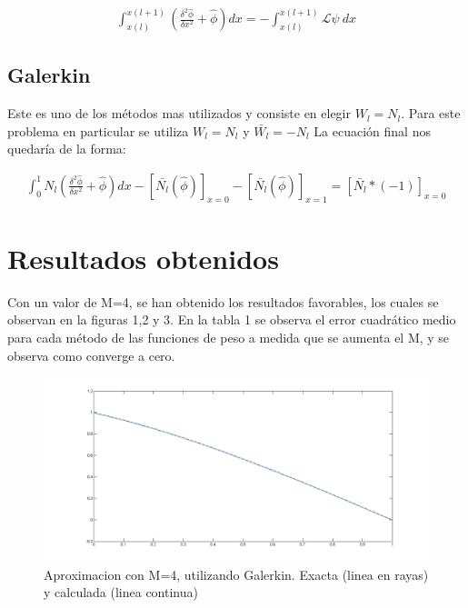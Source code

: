 \documentclass[11pt]{article}
\begin{document}
\begin{equation}
\begin{split}
\int_{x(l)}^{x(l+1)} (\frac{\delta^2\hat{\phi}}{\delta x^2} + \hat{\phi}) dx = - \int_{x(l)}^{x(l+1)} \mathcal{L} \psi \ dx
\end{split}
\end{equation}

\bigskip 
\subsection{Galerkin}

Este es uno de los m\'etodos mas utilizados y consiste en elegir $W_l = N_l$. Para este problema en particular se utiliza $W_l = N_l$ y $\bar{W_l} = -N_l$ La ecuaci\'on final nos quedar\'ia de la forma:

\begin{equation}
\begin{split}
\int_0^1 N_l (\frac{\delta^2\hat{\phi}}{\delta x^2} + \hat{\phi}) dx - \left[\bar{N_l} (\hat{\phi}) \right]_{x=0} -  \left[\bar{N_l} (\hat{\phi}) \right]_{x=1} = \left[\bar{N_l} * (-1) \right]_{x=0} 
\end{split}
\end{equation}
\bigskip

\section{Resultados obtenidos}

Con un valor de M=4, se han obtenido los resultados favorables, los cuales se observan en la figuras 1,2 y 3. En la tabla 1 se observa el error cuadr\'atico medio para cada m\'etodo de las funciones de peso a medida que se aumenta el M, y se observa como converge a cero.

\begin{figure}
	\centering
		\includegraphics[width=1.0\textwidth]{Fig1.png}
	\caption{Aproximacion con M=4, utilizando Galerkin. Exacta (linea en rayas) y calculada (linea continua)}
	\label{fig:Fig1}
\end{figure}
\end{document}
